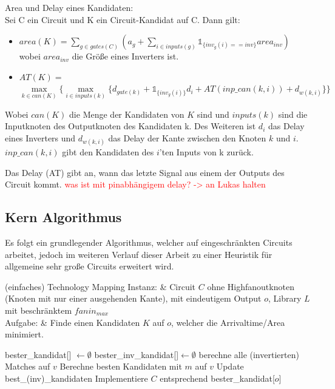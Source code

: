 \documentclass[11pt, a4paper, german]{article}
\begin{document}
\begin{definition}{Area und Delay eines Kandidaten:}\\
Sei C ein Circuit und K ein Circuit-Kandidat auf C. Dann gilt: \\
\begin{itemize}
\item $area(K) = \sum_{g \in gates(C)} (a_g + \sum_{i \in inputs(g)} \mathbb{1}_{\{inv_g(i)==inv\}} area_{inv})$ \\
wobei $area_{inv}$ die Größe eines Inverters ist.
\item $AT(K) = $\\$  \max\limits_{k \in can(K)} \{\max\limits_{i \in inputs(k)} \{   d_{gate(k)} + \mathbb{1}_{\{inv_g(i) \}} d_{i} + AT(inp\_can(k,i)) + d_{w(k,i)} \} \}$ 
\end{itemize}
Wobei $can(K)$ die Menge der Kandidaten von $K$ sind und $inputs(k)$ sind die Inputknoten des Outputknoten des Kandidaten k. Des Weiteren ist $d_i$ das Delay eines Inverters und $d_{w(k,i)} $ das Delay der Kante zwischen den Knoten $k$ und $i$. $inp\_can(k,i)$ gibt den Kandidaten des $i$'ten Inputs von k zurück. 

\end{definition}

Das Delay (AT) gibt an, wann das letzte Signal aus einem der Outputs des Circuit kommt.
\textcolor{red}{was ist mit pinabhängigem delay? -> an Lukas halten}

\subsection{Kern Algorithmus}

Es folgt ein grundlegender Algorithmus, welcher auf eingeschränkten Circuits arbeitet, jedoch im weiteren Verlauf dieser Arbeit zu einer Heuristik für allgemeine sehr große Circuits erweitert wird.

\begin{problem}[framed]{(einfaches) Technology Mapping}
  Instanz:  & Circuit $C$ ohne Highfanoutknoten (Knoten mit nur einer ausgehenden Kante), mit eindeutigem Output $o$, Library $L$ mit beschr\"anktem $fanin_{max}$\\
  Aufgabe: &  Finde einen Kandidaten $K$ auf $o$, welcher die Arrivaltime/Area minimiert.
\end{problem}

\begin{algorithm}[H]
 \LinesNumbered
 \DontPrintSemicolon
 \caption{(einfaches) Technology Mapping}

 bester\_kandidat[] $\gets \emptyset$\;
 bester\_inv\_kandidat[]$ \gets \emptyset$\;
 {
   berechne alle (invertierten) Matches auf $v$\;
   {
      Berechne besten Kandidaten mit $m$ auf $v$\;
      Update best\_(inv)\_kandidaten\;
   }
 }
 Implementiere $C$ entsprechend bester\_kandidat[$o$]\;
\end{algorithm}\ \\
\end{document}
